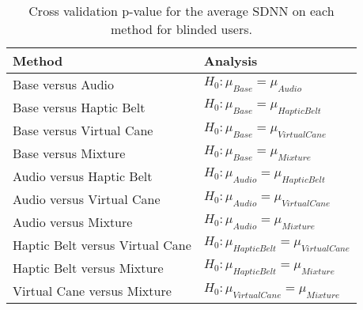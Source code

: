 
\begin{table}[!htb]
\centering
\caption{Cross validation p-value for the average SDNN on each method for blinded users.}
\label{tab:lsd_average_SDNN}
\begin{tabular}{ll}
\toprule
                         Method &                                      Analysis \\
\midrule
              Base versus Audio &               $H_{0} : \mu_{Base} = \mu_{Audio}$ \\
        Base versus Haptic Belt &         $H_{0} : \mu_{Base} = \mu_{Haptic Belt}$ \\
       Base versus Virtual Cane &        $H_{0} : \mu_{Base} = \mu_{Virtual Cane}$ \\
            Base versus Mixture &             $H_{0} : \mu_{Base} = \mu_{Mixture}$ \\
       Audio versus Haptic Belt &        $H_{0} : \mu_{Audio} = \mu_{Haptic Belt}$ \\
      Audio versus Virtual Cane &       $H_{0} : \mu_{Audio} = \mu_{Virtual Cane}$ \\
           Audio versus Mixture &            $H_{0} : \mu_{Audio} = \mu_{Mixture}$ \\
Haptic Belt versus Virtual Cane & $H_{0} : \mu_{Haptic Belt} = \mu_{Virtual Cane}$ \\
     Haptic Belt versus Mixture &      $H_{0} : \mu_{Haptic Belt} = \mu_{Mixture}$ \\
    Virtual Cane versus Mixture &     $H_{0} : \mu_{Virtual Cane} = \mu_{Mixture}$ \\
\bottomrule
\end{tabular}
\end{table}

